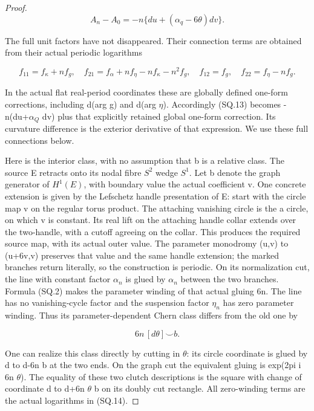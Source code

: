 \begin{proof}
\[
 A_n-A_0=-n\{du+(\alpha_q-6\theta)dv\}.             \tag{SQ.13}
\]

The full unit factors have not disappeared. Their connection terms
are obtained from their actual periodic logarithms

\[
 f_{11}=f_\kappa+nf_g,\quad
 f_{21}=f_\alpha+nf_\eta-nf_\kappa-n^2f_g,\quad
 f_{12}=f_g,\quad f_{22}=f_\eta-nf_g.                \tag{SQ.14}
\]

In the actual flat real-period coordinates these are globally defined
one-form corrections, including d(arg g) and d(arg \(\eta\)). Accordingly
(SQ.13) becomes -n(du+\(\alpha_{Q}\) dv) plus that explicitly retained
global one-form correction. Its curvature difference is the exterior
derivative of that expression. We use these full connections below.

Here is the interior class, with no assumption that b is a relative
class. The source E retracts onto its nodal fibre \(S^{2}\) wedge \(S^{1}\).
Let b denote the graph generator of \(H^{1}(E)\), with boundary value the
actual coefficient v. One concrete extension is given by the Lefschetz
handle presentation of E: start with the circle map v on the regular
torus product. The attaching vanishing circle is the a circle, on
which v is constant. Its real lift on the attaching handle collar
extends over the two-handle, with a cutoff agreeing on the collar.
This produces the required source map, with its actual outer value.
The parameter monodromy (u,v) to (u+6v,v) preserves that value and
the same handle extension; the marked branches return literally,
so the construction is periodic. On its normalization cut,
the line with constant factor \(\alpha_{n}\) is glued by \(\alpha_{n}\) between the
two branches. Formula (SQ.2) makes the parameter winding of that
actual gluing 6n. The line has no vanishing-cycle factor and the
suspension factor \(\eta_{n}\) has zero parameter winding. Thus its
parameter-dependent Chern class differs from the old one by

\[
                         6n\,[d\theta]\smile b.         \tag{SQ.15}
\]

One can realize this class directly by cutting in \(\theta\): its circle
coordinate is glued by d to d-6n b at the two ends. On the graph cut
the equivalent gluing is exp(2pi i 6n \(\theta\)). The equality of these
two clutch descriptions is the square with change of coordinate
d to d+6n \(\theta\) b on its doubly cut rectangle. All zero-winding
terms are the actual logarithms in (SQ.14).


\end{proof}
